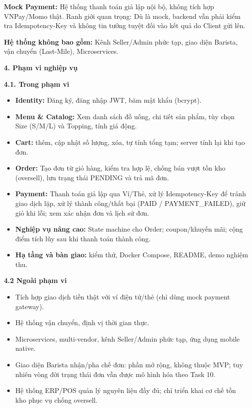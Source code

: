\documentclass[11pt,a4paper,oneside]{report}
\begin{document}
\textbf{Mock Payment:} Hệ thống thanh toán giả lập nội bộ, không tích hợp VNPay/Momo thật. Ranh giới quan trọng: Dù là mock, backend vẫn phải kiểm tra Idempotency-Key và không tin tưởng tuyệt đối vào kết quả do Client gửi lên.

\textbf{Hệ thống không bao gồm:} Kênh Seller/Admin phức tạp, giao diện Barista, vận chuyển (Last-Mile), Microservices.

\textbf{4. Phạm vi nghiệp vụ}

\textbf{4.1. Trong phạm vi}

\begin{itemize}
\item
  \textbf{Identity:} Đăng ký, đăng nhập JWT, băm mật khẩu (bcrypt).
\item
  \textbf{Menu \& Catalog:} Xem danh sách đồ uống, chi tiết sản phẩm, tùy chọn Size (S/M/L) và Topping, tính giá động.
\item
  \textbf{Cart:} thêm, cập nhật số lượng, xóa, tự tính tổng tạm; server tính lại khi tạo đơn.
\item
  \textbf{Order:} Tạo đơn từ giỏ hàng, kiểm tra hợp lệ, chống bán vượt tồn kho (oversell), lưu trạng thái PENDING và trả mã đơn.
\item
  \textbf{Payment:} Thanh toán giả lập qua Ví/Thẻ, xử lý Idempotency-Key để tránh giao dịch lặp, xử lý thành công/thất bại (PAID / PAYMENT\_FAILED), giữ giỏ khi lỗi; xem xác nhận đơn và lịch sử đơn.
\item
  \textbf{Nghiệp vụ nâng cao:} State machine cho Order; coupon/khuyến mãi; cộng điểm tích lũy sau khi thanh toán thành công.
\item
  \textbf{Hạ tầng và bàn giao:} kiểm thử, Docker Compose, README, demo nghiệm thu.
\end{itemize}

\textbf{4.2 Ngoài phạm vi}

\begin{itemize}
\item
  Tích hợp giao dịch tiền thật với ví điện tử/thẻ (chỉ dùng mock payment gateway).
\item
  Hệ thống vận chuyển, định vị thời gian thực.
\item
  Microservices, multi-vendor, kênh Seller/Admin phức tạp, ứng dụng mobile native.
\item
  Giao diện Barista nhận/pha chế đơn: phần mở rộng, không thuộc MVP; tuy nhiên vòng đời trạng thái đơn vẫn được mô hình hóa theo Task 10.
\item
  Hệ thống ERP/POS quản lý nguyên liệu đầy đủ; chỉ triển khai cơ chế tồn kho phục vụ chống oversell.
\end{itemize}
\end{document}
